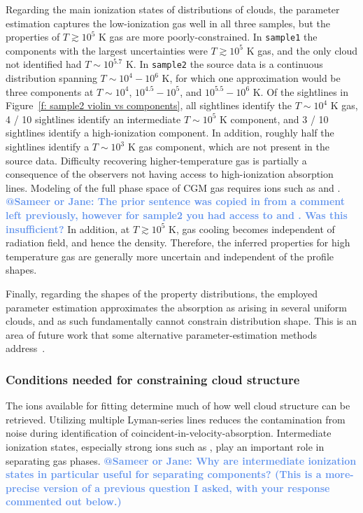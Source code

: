 \documentclass[fleqn,usenatbib]{mnras}
\makeatletter
\newcommand{\atsameer}[1]{\textcolor{CornflowerBlue}{\textbf{@Sameer or Jane: #1}}}
\makeatother
\begin{document}
Regarding the main ionization states of distributions of clouds,
the parameter estimation captures the low-ionization gas well in all three samples, but the properties of $T \gtrsim 10^5$ K gas are more poorly-constrained.
In \texttt{sample1} the components with the largest uncertainties were $T \gtrsim 10^5$ K gas,
and the only cloud not identified had $T \sim 10^{5.7}$ K.
In \texttt{sample2} the source data is a continuous distribution spanning $T \sim 10^4 - 10^6$ K,
for which one approximation would be three components at $T\sim 10^4$, $10^{4.5}-10^5$, and $10^{5.5}-10^6$ K.
Of the sightlines in Figure~\ref{f: sample2 violin vs components}, 
all sightlines identify the $T \sim 10^4$ K gas,
4 / 10 sightlines identify an intermediate $T \sim 10^5$ K component,
and 3 / 10 sightlines identify a high-ionization component.
In addition, roughly half the sightlines identify a $T \sim 10^3$ K gas component, which are not present in the source data.
Difficulty recovering higher-temperature gas is partially a consequence of the observers not having access to high-ionization absorption lines.
Modeling of the full phase space of CGM gas requires ions such as  and .
\atsameer{The prior sentence was copied in from a comment left previously, however for sample2 you had access to \ion{Ne}{VIII} and \ion{Mg}{X}. Was this insufficient?}
In addition, at $T \gtrsim 10^5$ K, gas cooling becomes independent of radiation field, and hence the density. 
Therefore, the inferred properties for high temperature gas are generally more uncertain and independent of the profile shapes.

Finally, regarding the shapes of the property distributions,
the employed parameter estimation approximates the absorption as arising in several uniform clouds,
and as such fundamentally cannot constrain distribution shape.
This is an area of future work that some alternative parameter-estimation methods address~\citep[e.g.][]{stern2016Universal}.

\subsubsection{Conditions needed for constraining cloud structure}

The ions available for fitting determine much of how well cloud structure can be retrieved.
Utilizing multiple Lyman-series lines reduces the contamination from noise during identification of coincident-in-velocity-absorption.
Intermediate ionization states, especially strong ions such as , play an important role in separating gas phases.
\atsameer{Why are intermediate ionization states in particular useful for separating components? (This is a more-precise version of a previous question I asked, with your response commented out below.)}
\end{document}
